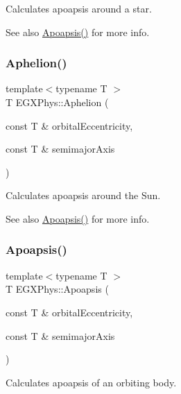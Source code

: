 Calculates apoapsis around a star. 

\begin{DoxySeeAlso}{See also}
\hyperlink{group___astrophysics_gaf962e650bf84a568458e8eb39b1c61ba}{Apoapsis()} for more info. 
\end{DoxySeeAlso}
\mbox{\label{group___astrophysics_ga77dadb4d082a441c8e85203c983722c7}} 
\subsubsection{\texorpdfstring{Aphelion()}{Aphelion()}}
{\footnotesize\ttfamily template$<$typename T $>$ \\
T E\+G\+X\+Phys\+::\+Aphelion (\begin{DoxyParamCaption}\item[{const T \&}]{orbital\+Eccentricity,  }\item[{const T \&}]{semimajor\+Axis }\end{DoxyParamCaption})}



Calculates apoapsis around the Sun. 

\begin{DoxySeeAlso}{See also}
\hyperlink{group___astrophysics_gaf962e650bf84a568458e8eb39b1c61ba}{Apoapsis()} for more info. 
\end{DoxySeeAlso}
\mbox{\label{group___astrophysics_gaf962e650bf84a568458e8eb39b1c61ba}} 
\subsubsection{\texorpdfstring{Apoapsis()}{Apoapsis()}}
{\footnotesize\ttfamily template$<$typename T $>$ \\
T E\+G\+X\+Phys\+::\+Apoapsis (\begin{DoxyParamCaption}\item[{const T \&}]{orbital\+Eccentricity,  }\item[{const T \&}]{semimajor\+Axis }\end{DoxyParamCaption})}



Calculates apoapsis of an orbiting body. 

